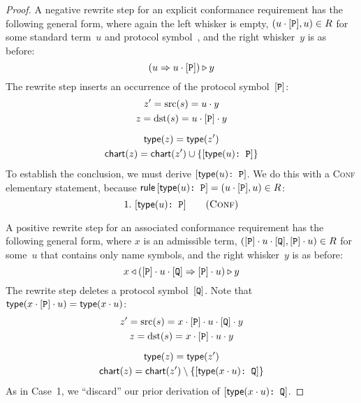 \documentclass[../generics]{subfiles}
\begin{document}
\begin{proof}
 A negative rewrite step for an explicit conformance requirement has the following general form, where again the left whisker is empty, $(u\cdot[\texttt{P}],u)\in R$ for some standard term~$u$ and protocol symbol~\pP, and the right whisker~$y$ is as before:
\[(u\Rightarrow u\cdot[\texttt{P}])\triangleright y\]
The rewrite step inserts an occurrence of the protocol symbol~$[\texttt{P}]$:
\begin{gather*}
z^\prime=\operatorname{src}(s)=u\cdot y\\
z=\operatorname{dst}(s)=u\cdot[\texttt{P}]\cdot y\\[\medskipamount]
\mathsf{type}(z)=\mathsf{type}(z^\prime)\\
\mathsf{chart}(z)=\mathsf{chart}(z^\prime) \cup \{[\texttt{$\mathsf{type}(u)$:~P}]\}
\end{gather*}
To establish the conclusion, we must derive $[\texttt{$\mathsf{type}(u)$:~P}]$. We do this with a \textsc{Conf} elementary statement, because $\mathsf{rule}\,[\texttt{$\mathsf{type}(u)$:~P}]=(u\cdot[\texttt{P}],u)\in R$:
\[
\ConfStep{$\Type(u)$}{P}{1}
\]

 A positive rewrite step for an associated conformance requirement has the following general form, where $x$ is an admissible term, $([\texttt{P}]\cdot u\cdot[\texttt{Q}],[\texttt{P}]\cdot u)\in R$ for some~$u$ that contains only name symbols, and the right whisker~$y$ is as before:
\[x\triangleleft([\texttt{P}]\cdot u\cdot[\texttt{Q}]\Rightarrow[\texttt{P}]\cdot u)\triangleright y\]
The rewrite step deletes a protocol symbol~$[\texttt{Q}]$. Note that $\mathsf{type}(x\cdot [\texttt{P}] \cdot u)=\mathsf{type}(x\cdot u)$:
\begin{gather*}
z^\prime=\operatorname{src}(s)=x\cdot[\texttt{P}]\cdot u\cdot[\texttt{Q}]\cdot y\\
z=\operatorname{dst}(s)=x\cdot[\texttt{P}]\cdot u\cdot y\\[\medskipamount]
\mathsf{type}(z)=\mathsf{type}(z^\prime)\\
\mathsf{chart}(z)=\mathsf{chart}(z^\prime) \setminus \{[\texttt{$\mathsf{type}(x\cdot u)$:~Q}]\}
\end{gather*}
As in Case~1, we ``discard'' our prior derivation of $[\texttt{$\mathsf{type}(x\cdot u)$:~Q}]$.


\end{proof}
\end{document}
